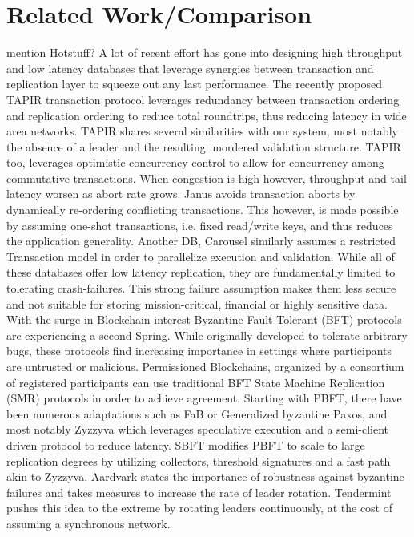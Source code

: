\section{Related Work/Comparison}  mention Hotstuff?
A lot of recent effort has gone into designing high throughput and low latency databases that leverage synergies between transaction and replication layer to squeeze out any last performance. The recently proposed TAPIR transaction protocol leverages redundancy between transaction ordering and replication ordering to reduce total roundtrips, thus reducing latency in wide area networks. TAPIR shares several similarities with our system, most notably the absence of a leader and the resulting unordered validation structure. TAPIR too, leverages optimistic concurrency control to allow for concurrency among commutative transactions. When congestion is high however, throughput and tail latency worsen as abort rate grows. Janus avoids transaction aborts by dynamically re-ordering conflicting transactions. This however, is made possible by assuming one-shot transactions, i.e. fixed read/write keys, and thus reduces the application generality. Another DB, Carousel similarly assumes a restricted Transaction model in order to parallelize execution and validation. While all of these databases offer low latency replication, they are fundamentally limited to tolerating crash-failures. This strong failure assumption makes them less secure and not suitable for storing mission-critical, financial or highly sensitive data. 
With the surge in Blockchain interest Byzantine Fault Tolerant (BFT) protocols are experiencing a second Spring. While originally developed to tolerate arbitrary bugs, these protocols find increasing importance in settings where participants are untrusted or malicious. Permissioned Blockchains, organized by a consortium of registered participants can use traditional BFT State Machine Replication (SMR) protocols in order to achieve agreement. Starting with PBFT, there have been numerous adaptations such as FaB or Generalized byzantine Paxos, and most notably Zyzzyva which leverages speculative execution and a semi-client driven protocol to reduce latency. SBFT modifies PBFT to scale to large replication degrees by utilizing collectors, threshold signatures and a fast path akin to Zyzzyva. Aardvark states the importance of robustness against byzantine failures and takes measures to increase the rate of leader rotation. Tendermint pushes this idea to the extreme by rotating leaders continuously, at the cost of assuming a synchronous network.
